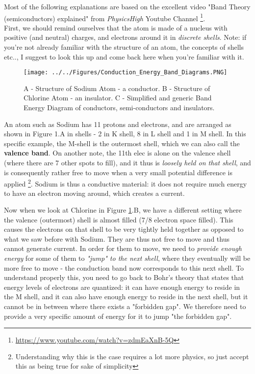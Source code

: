 Most of the following explanations are based on the excellent video "Band Theory (semiconductors) explained" from \textit{PhysicsHigh} Youtube Channel \footnote{\url{https://www.youtube.com/watch?v=zdmEaXnB-5Q}}. \\ 

First, we should remind ourselves that the atom is made of a nucleus with positive (and neutral) charges, and electrons around it in \textit{discrete shells}. Note: if you're not already familiar with the structure of an atom, the concepts of shells etc.., I suggest to look this up and come back here when you're familiar with it.

\begin{figure}[H]
    \centering
    \texttt{[image: ../../Figures/Conduction\_Energy\_Band\_Diagrams.PNG]}
    \caption{A - Structure of Sodium Atom - a conductor. B - Structure of Chlorine Atom - an insulator. C - Simplified and generic Band Energy Diagram of conductors, semi-conductors and insulators.}
    \label{fig:Conduction}
\end{figure}

An atom such as Sodium has 11 protons and electrons, and are arranged as shown in Figure 1.A in shells - 2 in K shell, 8 in L shell and 1 in M shell.  In this specific example, the M-shell is the outermost shell, which we can also call the \textbf{valence band}. On another note, the 11th elec is alone on the valence shell (where there are 7 other spots to fill), and it thus is \textit{loosely held on that shell}, and is consequently rather free to move when a very small potential difference is applied \footnote{Understanding why this is the case requires a lot more physics, so just accept this as being true for sake of simplicity}. Sodium is thus a conductive material: it does not require much energy to have an electron moving around, which creates a current.

Now when we look at Chlorine in Figure \ref{fig:Conduction}.B, we have a different setting where the valence (outermost) shell is almost filled (7/8 electron space filled). This causes the electrons on that shell to be very tightly held together as opposed to what we saw before with Sodium. They are thus not free to move and thus cannot generate current. In order for them to move, we need to \textit{provide enough energy} for some of them to \textit{"jump" to the next shell}, where they eventually will be more free to move - the conduction band now corresponds to this next shell. To understand properly this, you need to go back to Bohr's theory that states that energy levels of electrons are quantized: it can have enough energy to reside in the M shell, and it can also have enough energy to reside in the next shell, but it cannot be in between where there exists a "forbidden gap". We therefore need to provide a very specific amount of energy for it to jump "the forbidden gap".   

